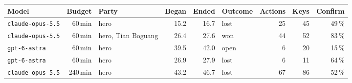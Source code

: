 \begin{tabular}{@{}lrlrrlrrr@{}}
\toprule
Model & Budget & Party & Began & Ended & Outcome & Actions & Keys & Confirm \\
\midrule
\texttt{claude-opus-5.5} & 60\,min & hero & 15.2 & 16.7 & lost & 25 & 45 & 49\,\% \\
\texttt{claude-opus-5.5} & 60\,min & hero, Tian Boguang & 26.4 & 27.6 & won & 44 & 52 & 83\,\% \\
\texttt{gpt-6-astra} & 60\,min & hero & 39.5 & 42.0 & open & 6 & 20 & 15\,\% \\
\texttt{gpt-6-astra} & 60\,min & hero & 26.9 & 27.9 & lost & 6 & 11 & 64\,\% \\
\texttt{claude-opus-5.5} & 240\,min & hero & 43.2 & 46.7 & lost & 67 & 86 & 52\,\% \\
\bottomrule
\end{tabular}
